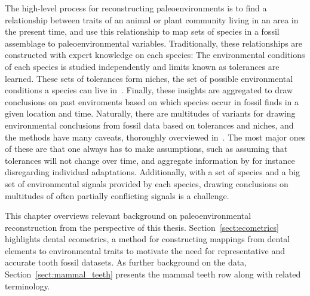 \documentclass[english,twoside,openright]{UH_DS_MSc}
\begin{document}
The high-level process for reconstructing paleoenvironments is to find a relationship between traits of an 
animal or plant community living in an area in the present time, and use this 
relationship to map sets of species in a fossil assemblage to paleoenvironmental variables.
Traditionally, these relationships are constructed with expert knowledge on each species: The environmental conditions of
each species is studied independently and limits known as tolerances are learned. These sets of tolerances form niches,
the set of possible environmental conditions a species can live in~\cite{Faith_Lyman_2019}. Finally, these insights are aggregated to 
draw conclusions on past enviroments based on which species occur in fossil finds in a given location and time.
Naturally, there are multitudes of variants for drawing environmental conclusions from fossil data based on 
tolerances and niches, and the methods have many caveats, thoroughly overviewed in~\cite{Faith_Lyman_2019}. The most major ones of these are that one always has to 
make assumptions, such as assuming that tolerances will not change over time, and aggregate information by for instance 
disregarding individual adaptations. Additionally, with a set of species and a big set of environmental signals provided 
by each species, drawing conclusions on multitudes of often partially conflicting signals is a challenge.

This chapter overviews relevant background on paleoenvironmental reconstruction from the perspective of this thesis.
Section~\ref{sect:ecometrics} highlights dental ecometrics, a method for constructing mappings from dental elements to environmental traits to motivate the 
need for representative and accurate tooth fossil datasets. As further background on the data, Section~\ref{sect:mammal_teeth} presents the mammal teeth 
row along with related terminology.
\end{document}
